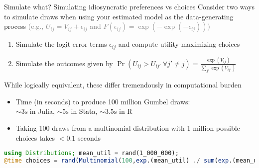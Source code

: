 \documentclass[11pt,notes=hide,aspectratio=169]{beamer}
\begin{document}
\begin{frame}[fragile]{Simulate what? Simulating idiosyncratic preferences vs choices}
Consider two ways to simulate draws when using your estimated model as the data-generating process 
\textcolor{gray}{(e.g., $U_{ij} = V_{ij} + \epsilon_{ij}$ and $F\left(\epsilon_{ij}\right)=\exp(-\exp(-\epsilon_{ij}))$)}
\begin{enumerate}
\item Simulate the logit error terms $\epsilon_{ij}$ and compute utility-maximizing choices
\item Simulate the outcomes given by $\Pr(U_{ij}>U_{ij'} \ \forall j' \neq j) = \frac{\exp(V_{ij})}{\sum_{j'}\exp(V_{ij'})}$
\end{enumerate}
\smallskip
While logically equivalent, these differ tremendously in computational burden
\begin{itemize}
\item Time (in seconds) to produce 100 million Gumbel draws:\\
\qquad $\sim3\text{s}$ in Julia, $\sim5\text{s}$ in Stata, $\sim3.5\text{s}$ in R
\item Taking 100 draws from a multinomial distribution with 1 million possible choices takes $<0.1$ seconds
\end{itemize}
\begin{lstlisting}[language=julia]
using Distributions; mean_util = rand(1_000_000);
@time choices = rand(Multinomial(100,exp.(mean_util) ./ sum(exp.(mean_util))));
\end{lstlisting}
\end{frame}
\end{document}
